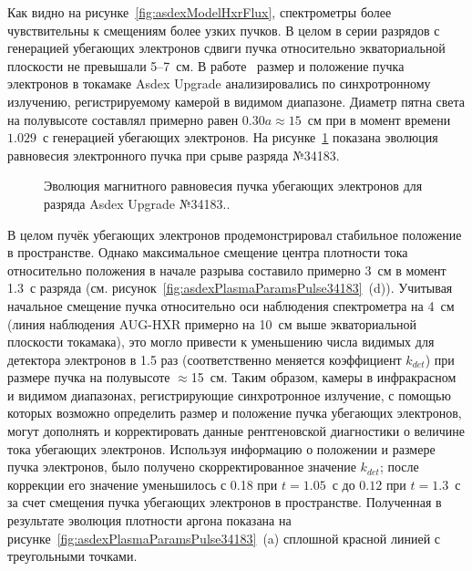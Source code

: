 Как видно на рисунке~\ref{fig:asdexModelHxrFlux}, спектрометры более чувствительны к смещениям более узких пучков. В целом в серии разрядов с генерацией убегающих электронов сдвиги пучка относительно экваториальной плоскости не превышали 5--7~см. В работе~\cite{PazSoldan2017} размер и положение пучка электронов в токамаке Asdex Upgrade анализировались по синхротронному излучению, регистрируемому камерой в видимом диапазоне. Диаметр пятна света на полувысоте составлял примерно равен $0.30 a \approx 15$~см при в момент времени $1.029$~с генерацией убегающих электронов. На рисунке~\ref{fig:asdexBeamEvolution34183} показана эволюция равновесия электронного пучка при срыве разряда №34183.~\cite{Shevelev2021}

\begin{figure}[ht!]
  \caption{ Эволюция магнитного равновесия пучка убегающих электронов для разряда Asdex Upgrade №34183..~\cite{Shevelev2021} }
  \label{fig:asdexBeamEvolution34183}
\end{figure}

В целом пучёк убегающих электронов продемонстрировал стабильное положение в пространстве. Однако максимальное смещение центра плотности тока относительно положения в начале разрыва составило примерно 3~см в момент 1.3~с разряда (см. рисунок~\ref{fig:asdexPlasmaParamsPulse34183}~(d)). Учитывая начальное смещение пучка относительно оси наблюдения спектрометра на 4~см (линия наблюдения AUG-HXR примерно на 10~см выше экваториальной плоскости токамака), это могло привести к уменьшению числа видимых для детектора электронов в 1.5 раз (соответственно меняется коэффициент $k_{det}$)  при размере пучка на полувысоте $\approx$15~см. Таким образом, камеры в инфракрасном и видимом диапазонах, регистрирующие синхротронное излучение, с помощью которых возможно определить размер и положение пучка убегающих электронов, могут дополнять и корректировать данные рентгеновской диагностики о величине тока убегающих электронов. Используя информацию о положении и размере пучка электронов, было получено скорректированное значение $k_{det}$; после коррекции его значение уменьшилось с 0.18 при $t = 1.05$~с до $0.12$ при $t = 1.3$~с за счет смещения пучка убегающих электронов в пространстве. Полученная в результате эволюция плотности аргона показана на рисунке~\ref{fig:asdexPlasmaParamsPulse34183}~(a) сплошной красной линией с треугольными точками.~\cite{Shevelev2021}

